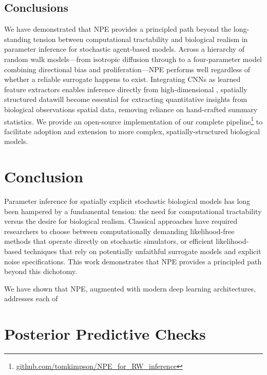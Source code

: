 \documentclass{article}
\providecommand{\DIFaddtex}[1]{{\protect\color{blue} \sf #1}} %
\providecommand{\DIFdeltex}[1]{{\protect\color{red} \scriptsize #1}} %
\providecommand{\DIFaddbegin}{} %
\providecommand{\DIFaddend}{} %
\providecommand{\DIFdelbegin}{} %
\providecommand{\DIFdelend}{} %
\providecommand{\DIFadd}[1]{\texorpdfstring{\DIFaddtex{#1}}{#1}} %
\providecommand{\DIFdel}[1]{\texorpdfstring{\DIFdeltex{#1}}{}} %
\newcommand{\DIFscaledelfig}{0.5}
\newlength{\DIFdelgraphicswidth} %
\newlength{\DIFdelgraphicsheight} %
\newcommand{\DIFaddincludegraphics}[2][]{{\color{blue}\fbox{\DIFOincludegraphics[#1]{#2}}}} %
\newcommand{\DIFdelincludegraphics}[2][]{%
\sbox{\DIFdelgraphicsbox}{\DIFOincludegraphics[#1]{#2}}%
\settoboxwidth{\DIFdelgraphicswidth}{\DIFdelgraphicsbox} %
\settoboxtotalheight{\DIFdelgraphicsheight}{\DIFdelgraphicsbox} %
\scalebox{\DIFscaledelfig}{%
\parbox[b]{\DIFdelgraphicswidth}{\usebox{\DIFdelgraphicsbox}\\[-\baselineskip] \rule{\DIFdelgraphicswidth}{0em}}\llap{\resizebox{\DIFdelgraphicswidth}{\DIFdelgraphicsheight}{%
\setlength{\unitlength}{\DIFdelgraphicswidth}%
\begin{picture}(1,1)%
\thicklines\linethickness{2pt} %
{\color[rgb]{1,0,0}\put(0,0){\framebox(1,1){}}}%
{\color[rgb]{1,0,0}\put(0,0){\line( 1,1){1}}}%
{\color[rgb]{1,0,0}\put(0,1){\line(1,-1){1}}}%
\end{picture}%
}\hspace*{3pt}}} %
} %
\DeclareRobustCommand{\DIFaddbegin}{\DIFOaddbegin \let\includegraphics\DIFaddincludegraphics} %
\DeclareRobustCommand{\DIFaddend}{\DIFOaddend \let\includegraphics\DIFOincludegraphics} %
\DeclareRobustCommand{\DIFdelbegin}{\DIFOdelbegin \let\includegraphics\DIFdelincludegraphics} %
\DeclareRobustCommand{\DIFdelend}{\DIFOaddend \let\includegraphics\DIFOincludegraphics} %
\begin{document}
\subsection{\DIFadd{Conclusions}}

\DIFadd{We have demonstrated that NPE provides a principled path beyond the long-standing tension between computational tractability and biological realism in parameter inference for stochastic agent-based models. Across a hierarchy of random walk models---from isotropic diffusion through to a four-parameter model combining directional bias and proliferation---NPE performs well regardless of whether a reliable surrogate happens to exist. Integrating CNNs as learned feature extractors enables inference }\DIFaddend directly from high-dimensional \DIFdelbegin \DIFdel{, spatially structured datawill become essential for extracting quantitative insights from biological observations}\DIFdelend \DIFaddbegin \DIFadd{spatial data, removing reliance on hand-crafted summary statistics. We provide an open-source implementation of our complete pipeline}\footnote{\href{https://github.com/tomkimpson/NPE_for_RW_inference}{\DIFadd{github.com/tomkimpson/NPE\_for\_RW\_inference}}} \DIFadd{to facilitate adoption and extension to more complex, spatially-structured biological models}\DIFaddend .

\DIFdelbegin \section{\DIFdel{Conclusion}}
\addtocounter{section}{-1}%
\DIFdelend \DIFaddbegin \newpage
\DIFaddend 


\DIFdelbegin \DIFdel{Parameter inference for spatially explicit stochastic biological models has long been hampered by a fundamental tension: the need for computational tractability versus the desire for biological realism. Classical approaches have required researchers to choose between computationally demanding likelihood-free methods that operate directly on stochastic simulators, or efficient likelihood-based techniques that rely on potentially unfaithful surrogate models and explicit noise specifications.
This work demonstrates that NPE provides a principled path beyond this dichotomy.
}\DIFdelend \DIFaddbegin 

\DIFaddend 

\DIFdelbegin \DIFdel{We have shown that NPE, augmented with modern deep learning architectures, addresses each of }\DIFdelend \DIFaddbegin \newpage
\appendix
\section{\DIFadd{Posterior Predictive Checks}}\label{sec:appendix_ppc}
\end{document}
